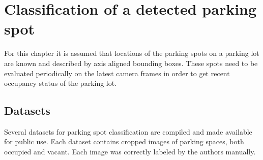 \documentclass[thesis=M,english]{FITthesis}[2019/03/06]
\begin{document}
\section{Classification of a detected parking spot}
For this chapter it is assumed that locations of the parking spots on a parking lot are known and described by axis aligned bounding boxes. These spots need to be evaluated periodically on the latest camera frames in order to get recent occupancy status of the parking lot.\\





\subsection{Datasets}
Several datasets for parking spot classification are compiled and made available for public use. Each dataset contains cropped images of parking spaces, both occupied and vacant. Each image was correctly labeled by the authors manually.
\end{document}
